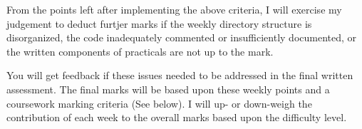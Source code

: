 \begin{appendices}
From the points left after implementing the above criteria, I will 
exercise my judgement to deduct furtjer marks if the weekly directory 
structure is disorganized, the code inadequately commented or 
insufficiently documented, or the written components of practicals are 
not up to the mark. 

You will get feedback if these issues needed to be addressed in the 
final written assessment. The final marks will be based upon these 
weekly points and a coursework marking criteria (See below). I will 
 up- or down-weigh the contribution of each week to the 
overall marks based upon the difficulty level. 


\end{appendices}
